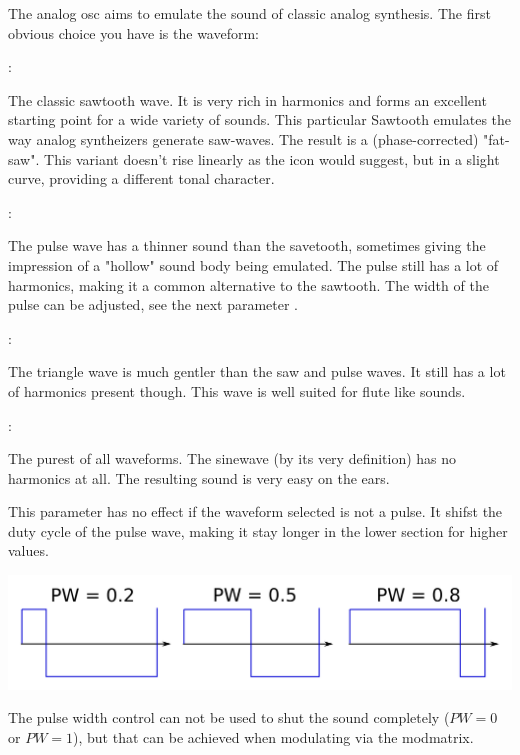 The analog osc aims to emulate the sound of classic analog synthesis. The first obvious choice you have is the waveform:

{

:

The classic sawtooth wave. It is very rich in harmonics and forms an excellent starting point for a wide variety of sounds. This particular Sawtooth emulates the way analog syntheizers generate saw-waves. The result is a (phase-corrected) "fat-saw". This variant doesn't rise linearly as the icon would suggest, but in a slight curve, providing a different tonal character.

:

The pulse wave has a thinner sound than the savetooth, sometimes giving the impression of a "hollow" sound body being emulated. The pulse still has a lot of harmonics, making it a common alternative to the sawtooth. The width of the pulse can be adjusted, see the next parameter .

:

The triangle wave is much gentler than the saw and pulse waves. It still has a lot of harmonics present though. This wave is well suited for flute like sounds.

:

The purest of all waveforms. The sinewave (by its very definition) has no harmonics at all. The resulting sound is very easy on the ears.}

{This parameter has no effect if the waveform selected is not a pulse. It shifst the duty cycle of the pulse wave, making it stay longer in the lower section for higher values.

\begin{center}
    \includegraphics[width=\textwidth]{graphics/PWM.png}
\end{center}

The pulse width control can not be used to shut the sound completely ($PW = 0$ or $PW = 1$), but that can be achieved when modulating via the modmatrix.}

